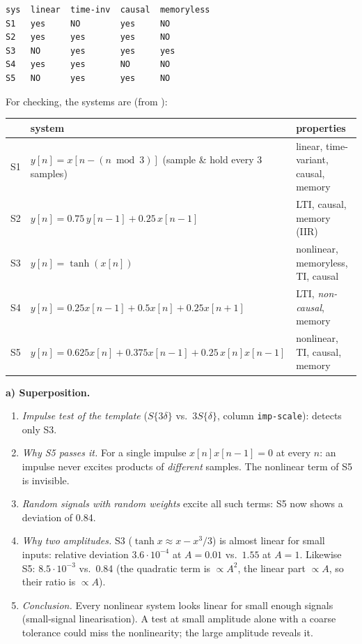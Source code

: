 \begin{solution}
\begin{lstlisting}[style=shell,numbers=none]
sys  linear  time-inv  causal  memoryless
S1   yes     NO        yes     NO
S2   yes     yes       yes     NO
S3   NO      yes       yes     yes
S4   yes     yes       NO      NO
S5   NO      yes       yes     NO
\end{lstlisting}
For checking, the systems are (from ):
\begin{center}
\small
\begin{tabular}{@{}lll@{}}
\toprule
& system & properties \\
\midrule
S1 & $y[n]=x[n-(n\bmod 3)]$ (sample \& hold every 3 samples) & linear, time-variant, causal, memory \\
S2 & $y[n]=0.75\,y[n-1]+0.25\,x[n-1]$ & LTI, causal, memory (IIR) \\
S3 & $y[n]=\tanh(x[n])$ & nonlinear, memoryless, TI, causal \\
S4 & $y[n]=0.25x[n-1]+0.5x[n]+0.25x[n+1]$ & LTI, \emph{non-causal}, memory \\
S5 & $y[n]=0.625x[n]+0.375x[n-1]+0.25\,x[n]x[n-1]$ & nonlinear, TI, causal, memory \\
\bottomrule
\end{tabular}
\end{center}

\textbf{a) Superposition.}
\begin{enumerate}[label=Step \arabic*:,leftmargin=*,itemsep=1pt]
  \item \emph{Impulse test of the template} ($S\{3\delta\}$ vs.\ $3S\{\delta\}$,
    column \texttt{imp-scale}): detects only S3.
  \item \emph{Why S5 passes it.} For a single impulse $x[n]x[n-1]=0$ at every
    $n$: an impulse never excites products of \emph{different} samples. The
    nonlinear term of S5 is invisible.
  \item \emph{Random signals with random weights} excite all such terms:
    S5 now shows a deviation of 0.84.
  \item \emph{Why two amplitudes.} S3 ($\tanh x\approx x-x^3/3$) is almost
    linear for small inputs: relative deviation $3.6\cdot10^{-4}$ at $A=0.01$
    vs.\ $1.55$ at $A=1$. Likewise S5: $8.5\cdot10^{-3}$ vs.\ 0.84 (the
    quadratic term is $\propto A^2$, the linear part $\propto A$, so their
    ratio is $\propto A$).
  \item \emph{Conclusion.} Every nonlinear system looks linear for small enough
    signals (small-signal linearisation). A test at small amplitude alone with
    a coarse tolerance could miss the nonlinearity; the large amplitude
    reveals it.
\end{enumerate}


\end{solution}
